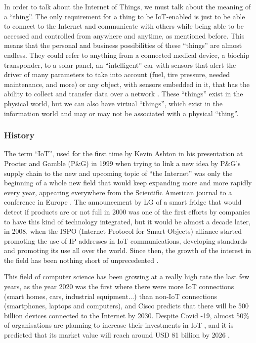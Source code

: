 \documentclass[12pt]{article}
\begin{document}
In order to talk about the Internet of Things, we must talk about the meaning of a ``thing''. The only requirement for a thing to be IoT-enabled is just to be able to connect to the Internet and communicate with others while being able to be accessed and controlled from anywhere and anytime, as mentioned before. This means that the personal and business possibilities of these ``things'' are almost endless. They could refer to anything from a connected medical device, a biochip transponder, to a solar panel, an ``intelligent'' car with sensors that alert the driver of many parameters to take into account (fuel, tire pressure, needed maintenance, and more) or any object, with sensors embedded in it, that has the ability to collect and transfer data over a network \cite{aeris}. These ``things'' exist in the physical world, but we can also have virtual ``things'', which exist in the information world and may or may not be associated with a physical ``thing''. 

\subsubsection{History}

The term ``IoT'', used for the first time by Kevin Ashton in his presentation at Procter and Gamble (P\&G) in 1999 when trying to link a new idea by P\&G's supply chain to the new and upcoming topic of ``the Internet'' was only the beginning of a whole new field that would keep expanding more and more rapidly every year, appearing everywhere from the Scientific American journal to a conference in Europe \cite{ashton}. The announcement by LG of a smart fridge that would detect if products are or not full in 2000 was one of the first efforts by companies to have this kind of technology integrated, but it would be almost a decade later, in 2008, when the ISPO (Internet Protocol for Smart Objects) alliance started promoting the use of IP addresses in IoT communications, developing standards and promoting its use all over the world. Since then, the growth of the interest in the field has been nothing short of unprecedented \cite{suresh}.\par

This field of computer science has been growing at a really high rate the last few years, as the year 2020 was the first where there were more IoT connections (smart homes, cars, industrial equipment...) than non-IoT connections (smartphones, laptops and computers), and Cisco predicts that there will be 500 billion devices connected to the Internet by 2030. Despite Covid -19, almost 50\% of organisations are planning to increase their investments in IoT \cite{gartner:covid}, and it is predicted that its market value will reach around USD 81 billion by 2026 \cite{mordor}.   
\end{document}

